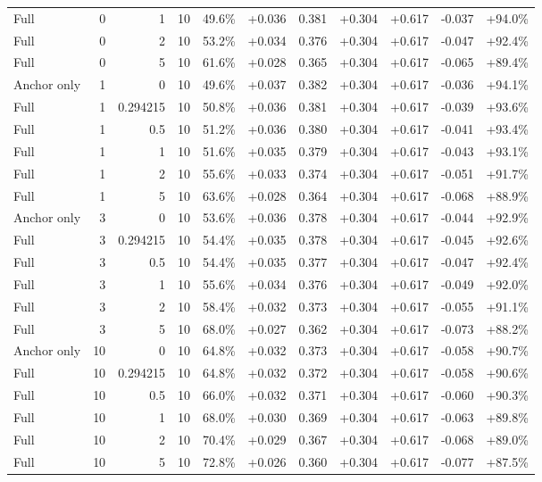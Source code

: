 \begin{table}[htbp]
\begin{tabular}{lrrrccccccc}
Full & 0 & 1 & 10 & 49.6\% & +0.036 & 0.381 & +0.304 & +0.617 & -0.037 & +94.0\% \\
Full & 0 & 2 & 10 & 53.2\% & +0.034 & 0.376 & +0.304 & +0.617 & -0.047 & +92.4\% \\
Full & 0 & 5 & 10 & 61.6\% & +0.028 & 0.365 & +0.304 & +0.617 & -0.065 & +89.4\% \\
Anchor only & 1 & 0 & 10 & 49.6\% & +0.037 & 0.382 & +0.304 & +0.617 & -0.036 & +94.1\% \\
Full & 1 & 0.294215 & 10 & 50.8\% & +0.036 & 0.381 & +0.304 & +0.617 & -0.039 & +93.6\% \\
Full & 1 & 0.5 & 10 & 51.2\% & +0.036 & 0.380 & +0.304 & +0.617 & -0.041 & +93.4\% \\
Full & 1 & 1 & 10 & 51.6\% & +0.035 & 0.379 & +0.304 & +0.617 & -0.043 & +93.1\% \\
Full & 1 & 2 & 10 & 55.6\% & +0.033 & 0.374 & +0.304 & +0.617 & -0.051 & +91.7\% \\
Full & 1 & 5 & 10 & 63.6\% & +0.028 & 0.364 & +0.304 & +0.617 & -0.068 & +88.9\% \\
Anchor only & 3 & 0 & 10 & 53.6\% & +0.036 & 0.378 & +0.304 & +0.617 & -0.044 & +92.9\% \\
Full & 3 & 0.294215 & 10 & 54.4\% & +0.035 & 0.378 & +0.304 & +0.617 & -0.045 & +92.6\% \\
Full & 3 & 0.5 & 10 & 54.4\% & +0.035 & 0.377 & +0.304 & +0.617 & -0.047 & +92.4\% \\
Full & 3 & 1 & 10 & 55.6\% & +0.034 & 0.376 & +0.304 & +0.617 & -0.049 & +92.0\% \\
Full & 3 & 2 & 10 & 58.4\% & +0.032 & 0.373 & +0.304 & +0.617 & -0.055 & +91.1\% \\
Full & 3 & 5 & 10 & 68.0\% & +0.027 & 0.362 & +0.304 & +0.617 & -0.073 & +88.2\% \\
Anchor only & 10 & 0 & 10 & 64.8\% & +0.032 & 0.373 & +0.304 & +0.617 & -0.058 & +90.7\% \\
Full & 10 & 0.294215 & 10 & 64.8\% & +0.032 & 0.372 & +0.304 & +0.617 & -0.058 & +90.6\% \\
Full & 10 & 0.5 & 10 & 66.0\% & +0.032 & 0.371 & +0.304 & +0.617 & -0.060 & +90.3\% \\
Full & 10 & 1 & 10 & 68.0\% & +0.030 & 0.369 & +0.304 & +0.617 & -0.063 & +89.8\% \\
Full & 10 & 2 & 10 & 70.4\% & +0.029 & 0.367 & +0.304 & +0.617 & -0.068 & +89.0\% \\
Full & 10 & 5 & 10 & 72.8\% & +0.026 & 0.360 & +0.304 & +0.617 & -0.077 & +87.5\% \\

\end{tabular}
\end{table}
